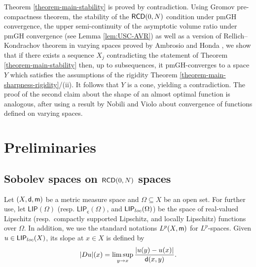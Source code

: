 \documentclass[11pt, reqno]{amsart}
\numberwithin{equation}{section}
\begin{document}
Theorem \ref{theorem-main-stability} is proved by contradiction. Using  Gromov pre-compactness theorem, the stability of the ${\sf RCD}(0,N)$ condition under pmGH convergence, the upper semi-continuity of the asymptotic volume ratio under pmGH convergence (see Lemma \ref{lem:USC-AVR}) as well as a version of Rellich--Kondrachov theorem in varying spaces proved by Ambrosio and Honda \cite{Ambrosio-Honda}, we show that if there exists a sequence $X_j$ contradicting the statement of Theorem \ref{theorem-main-stability} then, up to subsequences, it pmGH-converges to a space $Y$ which satisfies the assumptions of the rigidity Theorem \ref{theorem-main-sharpness-rigidity}/(ii). It follows that $Y$ is a cone, yielding a contradiction.
The proof of the second claim about the shape of an almost optimal function is analogous, after using a result by Nobili and Violo \cite{NV-Adv} about convergence of functions defined on varying spaces.


	
		
	
	
	
	\section{Preliminaries}
	\label{section-2}
	
	
	
	
	\subsection{Sobolev spaces on ${\sf RCD}(0,N)$ spaces}
	Let $(X,{\sf d}, {\sf m})$ be a metric measure space and $\Omega\subseteq X$ be an open  set. For further use, let $\mathsf{LIP}(\Omega)$  (resp.  $\mathsf{LIP_c}(\Omega)$, and $\mathsf{LIP}_{\rm loc}(\Omega)$) be the space of real-valued Lipschitz  (resp.\  compactly  supported Lipschitz,  and  locally Lipschitz) functions over $\Omega$. In addition, we use the standard notations $L^p(X,{\sf m})$ for $L^p$-spaces. Given $u\in \mathsf{LIP}_{\rm loc}(X)$, its slope at $x\in X$ is defined by  $$|Du|(x)=\limsup_{y\to x}\frac{|u(y)-u(x)|}{{\sf d}(x,y)}.$$
	  
	
	
\end{document}
